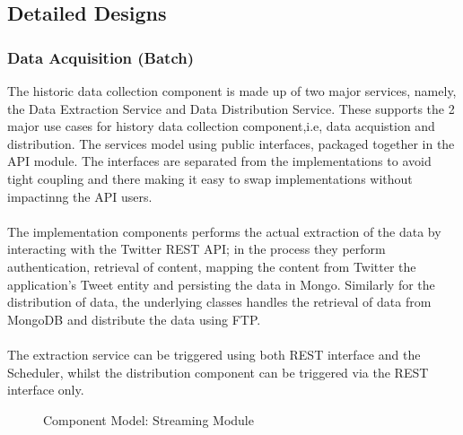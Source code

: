 \documentclass[12pt]{article} %
\begin{document}
	\subsection{Detailed Designs}
	
	\subsubsection{Data Acquisition (Batch)}
	
	The historic data collection component is made up of two major services, namely, the Data Extraction Service and Data Distribution Service. These supports the 2 major use cases for history data collection component,i.e, data acquistion and distribution. The services model using public interfaces, packaged together in the API module. The interfaces are separated from the implementations to avoid tight coupling and there making it easy to swap implementations without impactinng the API users.\\
	\\
	The implementation components performs the actual extraction of the data by interacting with the Twitter REST API; in the process they perform authentication, retrieval of content, mapping the content from Twitter the application's Tweet entity and persisting  the data in Mongo. Similarly  for the distribution of data, the underlying classes handles the retrieval of data from MongoDB and distribute the data using FTP.\\
	\\
	The extraction service can be triggered using both REST interface and the Scheduler, whilst the distribution component can be triggered via the REST interface only.
	
	
		\begin{figure}[H] %
			\caption{Component Model: Streaming Module}
			\label{fig:speciation}
		\end{figure}
	
\end{document}
